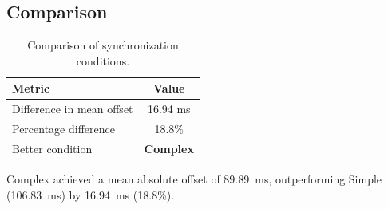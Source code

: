 \subsection*{Comparison}

\begin{table}[h!]
\centering
\begin{tabular}{|l|c|}
\hline
Metric & Value \\
\hline
Difference in mean offset & 16.94 ms \\
Percentage difference & 18.8\% \\
Better condition & \textbf{Complex} \\
\hline
\end{tabular}
\caption{Comparison of synchronization conditions.}
\label{tab:sync_comparison}
\end{table}

Complex achieved a mean absolute offset of 89.89~ms, outperforming Simple (106.83~ms) by 16.94~ms (18.8\%).
